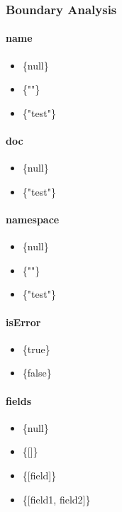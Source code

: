 \documentclass[12pt, a4paper]{article}
\begin{document}
\subsubsection{Boundary Analysis}

\paragraph{name}
\begin{itemize}
  \item \{null\} 
  \item \{""\}
  \item \{"test"\}
\end{itemize}

\paragraph{doc}
\begin{itemize}
  \item \{null\} 
  \item \{"test"\}
\end{itemize}

\paragraph{namespace}
\begin{itemize}
  \item \{null\} 
  \item \{""\}
  \item \{"test"\}
\end{itemize}

\paragraph{isError}
\begin{itemize}
  \item \{true\}
  \item \{false\}
\end{itemize}

\paragraph{fields}
\begin{itemize}
  \item \{null\} 
  \item \{[]\}
  \item \{[field]\}
  \item \{[field1, field2]\}
\end{itemize}
\end{document}
